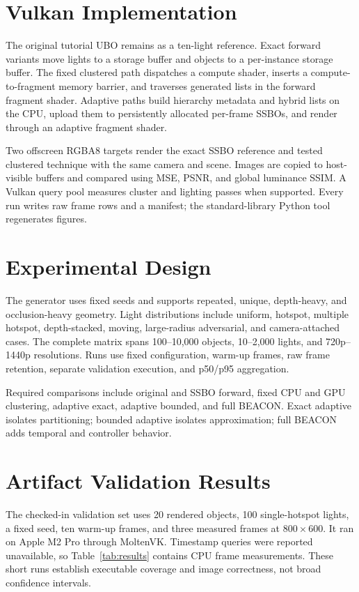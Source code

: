 \documentclass[10pt,twocolumn]{article}
\begin{document}
\section{Vulkan Implementation}
The original tutorial UBO remains as a ten-light reference. Exact forward variants move lights to a
storage buffer and objects to a per-instance storage buffer. The fixed clustered path dispatches a
compute shader, inserts a compute-to-fragment memory barrier, and traverses generated lists in the
forward fragment shader. Adaptive paths build hierarchy metadata and hybrid lists on the CPU, upload
them to persistently allocated per-frame SSBOs, and render through an adaptive fragment shader.

Two offscreen RGBA8 targets render the exact SSBO reference and tested clustered technique with the
same camera and scene. Images are copied to host-visible buffers and compared using MSE, PSNR, and
global luminance SSIM. A Vulkan query pool measures cluster and lighting passes when supported.
Every run writes raw frame rows and a manifest; the standard-library Python tool regenerates figures.

\section{Experimental Design}
The generator uses fixed seeds and supports repeated, unique, depth-heavy, and occlusion-heavy
geometry. Light distributions include uniform, hotspot, multiple hotspot, depth-stacked, moving,
large-radius adversarial, and camera-attached cases. The complete matrix spans 100--10,000 objects,
10--2,000 lights, and 720p--1440p resolutions. Runs use fixed configuration, warm-up frames, raw
frame retention, separate validation execution, and p50/p95 aggregation.

Required comparisons include original and SSBO forward, fixed CPU and GPU clustering, adaptive exact,
adaptive bounded, and full BEACON. Exact adaptive isolates partitioning; bounded adaptive isolates
approximation; full BEACON adds temporal and controller behavior.

\section{Artifact Validation Results}
The checked-in validation set uses 20 rendered objects, 100 single-hotspot lights, a fixed seed, ten
warm-up frames, and three measured frames at $800\times600$. It ran on Apple M2 Pro through
MoltenVK. Timestamp queries were reported unavailable, so Table~\ref{tab:results} contains CPU frame
measurements. These short runs establish executable coverage and image correctness, not broad
confidence intervals.
\end{document}
